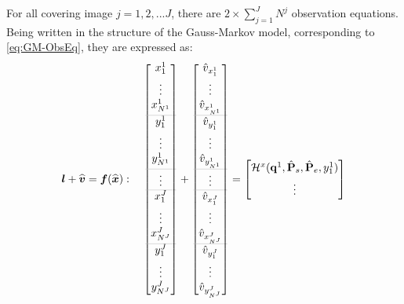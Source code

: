 For all covering image $j=1,2,...J$, there are $2\times\displaystyle\sum_{j=1}^{J}N^j$ observation equations. Being written in the structure of the Gauss-Markov model, corresponding to \cref{eq:GM-ObsEq}, they are expressed as:
\begin{equation} \label{eq:obsvec-allcam}
\boldsymbol l+\widehat{\boldsymbol v}=\boldsymbol f(\widehat{\boldsymbol x}):\quad
\begin{bmatrix}
 x^1_1\\[0.3em]
 \vdots\\
 x^1_{N^1}\\[0.3em]
 \arrayrulecolor{lightgray} \hline
 y^1_1\\[0.3em]
 \vdots\\
 y^1_{N^1}\\[0.3em]
 \arrayrulecolor{lightgray} \hline
 \vdots\\
 \arrayrulecolor{lightgray} \hline
 x^J_1\\[0.3em]
 \vdots\\
 x^J_{N^J}\\[0.3em]
 \arrayrulecolor{lightgray} \hline
 y^J_1\\[0.3em]
 \vdots\\
 y^J_{N^J}\\[0.3em]
\end{bmatrix}
+
\begin{bmatrix}
 \hat{v}_{x^1_1}\\[0.3em]
 \vdots\\
 \hat{v}_{x^1_{N^1}}\\[0.3em]
 \arrayrulecolor{lightgray} \hline
 \hat{v}_{y^1_1}\\[0.3em]
 \vdots\\
 \hat{v}_{y^1_{N^1}}\\[0.3em]
 \arrayrulecolor{lightgray} \hline
 \vdots\\
 \arrayrulecolor{lightgray} \hline
 \hat{v}_{x^J_1}\\[0.3em]
 \vdots\\
 \hat{v}_{x^J_{N^J}}\\[0.3em]
 \arrayrulecolor{lightgray} \hline
 \hat{v}_{y^J_1}\\[0.3em]
 \vdots\\
 \hat{v}_{y^J_{N^J}}\\[0.3em]
\end{bmatrix}
=
\begin{bmatrix}
 \mathcal{H}^x(\mathbf{q}^1,\hat{\mathbf{P}}_s,\hat{\mathbf{P}}_e,y^1_1)\\[0.3em]
 \vdots\\

\end{bmatrix}
\end{equation}
